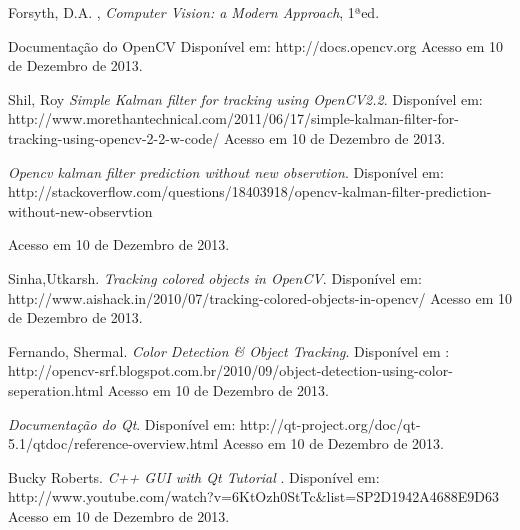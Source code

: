 \documentclass[journal]{IEEEtran}
\begin{document}
\begin{thebibliography}{1}

Forsyth, D.A. , \emph{Computer Vision: a Modern Approach}, 1ªed.

 Documentação do OpenCV
 Disponível em: http://docs.opencv.org
	 Acesso em 10 de Dezembro de 2013.

    Shil, Roy \emph{Simple Kalman filter for tracking using OpenCV2.2}.
    Disponível em: 
  http://www.morethantechnical.com/2011/06/17/simple-kalman-filter-for-
  tracking-using-opencv-2-2-w-code/
    Acesso em 10 de Dezembro de 2013.

    \emph{Opencv kalman filter prediction without new observtion}.
    Disponível em: 
    http://stackoverflow.com/questions/18403918/opencv-kalman-filter-prediction-without-new-observtion

    Acesso em 10 de Dezembro de 2013.

    Sinha,Utkarsh. \emph{Tracking colored objects in OpenCV}.
    Disponível em: 
    http://www.aishack.in/2010/07/tracking-colored-objects-in-opencv/
    Acesso em 10 de Dezembro de 2013.

    
    Fernando, Shermal. \emph{Color Detection \& Object Tracking}.
    Disponível em : http://opencv-srf.blogspot.com.br/2010/09/object-detection-using-color-seperation.html
    Acesso em 10 de Dezembro de 2013.

    \emph{Documentação do Qt}.
    Disponível em: 
    http://qt-project.org/doc/qt-5.1/qtdoc/reference-overview.html
    Acesso em 10 de Dezembro de 2013.

     Bucky Roberts. \emph{C++ GUI with Qt Tutorial }.
    Disponível em: 
    http://www.youtube.com/watch?v=6KtOzh0StTc\&list=SP2D1942A4688E9D63
    Acesso em 10 de Dezembro de 2013.
    
    \end{thebibliography}
\end{document}

